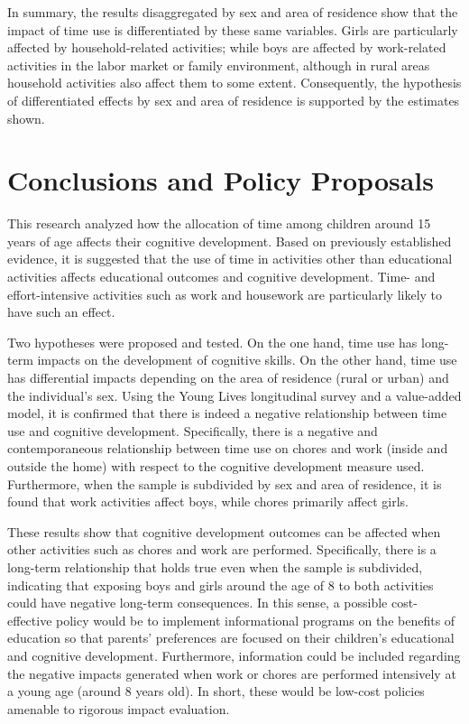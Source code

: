\documentclass[12pt]{article}
\begin{document}
In summary, the results disaggregated by sex and area of residence show that
the impact of time use is differentiated by these same variables. Girls are
particularly affected by household-related activities; while boys are affected
by work-related activities in the labor market or family environment, although
in rural areas household activities also affect them to some extent.
Consequently, the hypothesis of differentiated effects by sex and area of
residence is supported by the estimates shown.

\section{Conclusions and Policy Proposals}
\label{sec:conclusions}

This research analyzed how the allocation of time among children around 15
years of age affects their cognitive development. Based on previously
established evidence, it is suggested that the use of time in activities other
than educational activities affects educational outcomes and cognitive
development. Time- and effort-intensive activities such as work and housework
are particularly likely to have such an effect.

Two hypotheses were proposed and tested. On the one hand, time use has
long-term impacts on the development of cognitive skills. On the other hand,
time use has differential impacts depending on the area of residence (rural or
urban) and the individual's sex. Using the Young Lives longitudinal survey
and a value-added model, it is confirmed that there is indeed a negative
relationship between time use and cognitive development. Specifically, there
is a negative and contemporaneous relationship between time use on chores and
work (inside and outside the home) with respect to the cognitive development
measure used. Furthermore, when the sample is subdivided by sex and area of
residence, it is found that work activities affect boys, while chores
primarily affect girls.

These results show that cognitive development outcomes can be affected when
other activities such as chores and work are performed. Specifically, there is
a long-term relationship that holds true even when the sample is subdivided,
indicating that exposing boys and girls around the age of 8 to both activities
could have negative long-term consequences. In this sense, a possible
cost-effective policy would be to implement informational programs on the
benefits of education so that parents' preferences are focused on their
children's educational and cognitive development. Furthermore, information
could be included regarding the negative impacts generated when work or chores
are performed intensively at a young age (around 8 years old). In short, these
would be low-cost policies amenable to rigorous impact evaluation.
\end{document}
